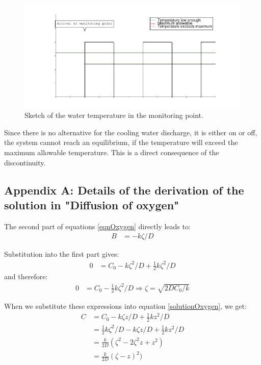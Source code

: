 \documentclass[onecolumn]{article}
\begin{document}
\begin{figure}
\begin{center}
\includegraphics{cyclic.pdf}
\caption{Sketch of the water temperature in the monitoring point.}
\label{cyclicBehaviour}
\end{center}
\end{figure}

Since there is no alternative for the cooling water discharge, it is either on or off, the system
cannot reach an equilibrium, if the temperature will exceed the maximum allowable temperature. This is
a direct consequence of the discontinuity.



\subsection*{Appendix A: Details of the derivation of the solution in "Diffusion of oxygen"}
\label{appOxygen}
The second part of equations \ref{eqnOxygen} directly leads to:
%
\begin{align}
         B &= -k\zeta/D
\end{align}

Substitution into the first part gives:
%
\begin{align}
         0 &= C_0 -k\zeta^2/D + \frac{1}{2} k\zeta^2/D
\end{align}
\noindent and therefore:
%
\begin{align}
         0 &= C_0 - \frac{1}{2} k\zeta^2/D \Rightarrow \zeta = \sqrt{2DC_0/k}
\end{align}

When we substitute these expressions into equation \ref{solutionOxygen}, we get:
\begin{align}
          C &= C_0 - k\zeta z / D + \frac{1}{2} k z^2/D \\
\nonumber   &= \frac{1}{2} k \zeta^2 / D - k\zeta z / D + \frac{1}{2} k z^2 / D \\
\nonumber   &= \frac{k}{2D} (\zeta^2 - 2 \zeta^2 z + z^2) \\
\nonumber   &= \frac{k}{2D} (\zeta - z)^2)
\end{align}
\end{document}
